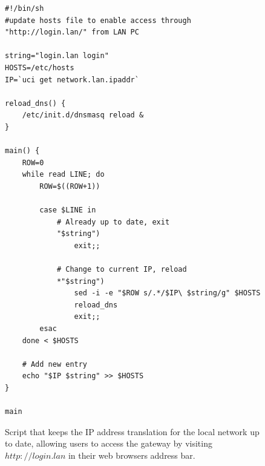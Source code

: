 \documentclass[a4paper,11pt,makeidx]{kth-bcs}
\begin{document}
   \begin{figure}[h!]
   \centering
      \lstset{language=sh}
      \begin{lstlisting}
#!/bin/sh
#update hosts file to enable access through "http://login.lan/" from LAN PC

string="login.lan login"
HOSTS=/etc/hosts
IP=`uci get network.lan.ipaddr`

reload_dns() {
    /etc/init.d/dnsmasq reload &
}

main() {
    ROW=0
    while read LINE; do
        ROW=$((ROW+1))

        case $LINE in
            # Already up to date, exit
            "$string")
                exit;;

            # Change to current IP, reload
            *"$string")
                sed -i -e "$ROW s/.*/$IP\ $string/g" $HOSTS
                reload_dns
                exit;;
        esac
    done < $HOSTS

    # Add new entry
    echo "$IP $string" >> $HOSTS
}

main
      \end{lstlisting}
      \caption{
         \small{
         Script that keeps the IP address translation for the local network up to date, allowing users to access the gateway by visiting $http://login.lan$ in their web browsers address bar.
      }
   }
   \label{fig:dnsmasq}
\end{figure}



\end{document}
